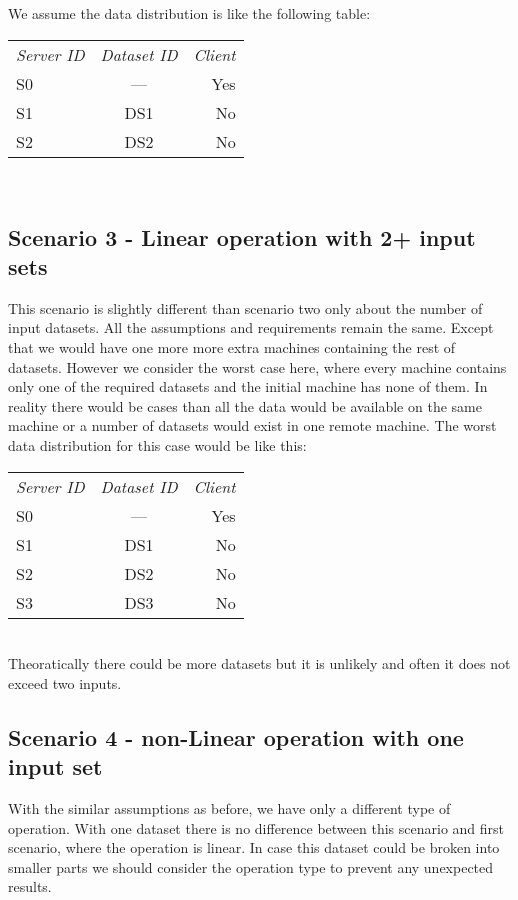 We assume the data distribution is like the following table:

\begin{tabular}{ l c r }
\em{Server ID} & \em{ Dataset ID} & \em{ Client} \\
S0 & --- & Yes \\
S1 & DS1 & No \\
S2 & DS2 & No \\
\end{tabular}\\

\subsection{Scenario 3 - Linear operation with 2+ input sets}
\label{sc:sc3}
This scenario is slightly different than scenario two only about the number of input datasets. All the assumptions and 
requirements remain the same. Except that we would have one more more extra machines containing the rest of datasets.
However we consider the worst case here, where every machine contains only one of the required datasets and the initial 
machine has none of them.
In reality there would be cases than all the data would be available on the same machine or a number of datasets
would exist in one remote machine. The worst data distribution for this case would be like this:

\begin{tabular}{ l c r }
\em{Server ID} & \em{ Dataset ID} & \em{ Client} \\
S0 & --- & Yes \\
S1 & DS1 & No \\
S2 & DS2 & No \\
S3 & DS3 & No \\
\end{tabular}\\

Theoratically there could be more datasets but it is unlikely and often it does not exceed two inputs.

\subsection{Scenario 4 - non-Linear operation with one input set}
With the similar assumptions as before, we have only a different type of operation. With one dataset there is no 
difference between this scenario and first scenario, where the operation is linear. In case this dataset could
be broken into smaller parts we should consider the operation type to prevent any unexpected results.


